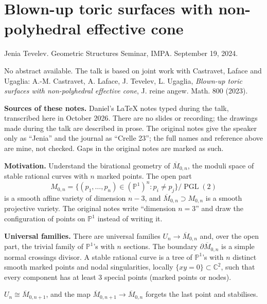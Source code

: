\section{Blown-up toric surfaces with
non-polyhedral effective cone}
\label{section-tevelev-blown-up-toric}

\noindent
Jenia Tevelev.
Geometric Structures Seminar, IMPA.
September 19, 2024.

\medskip\noindent
No abstract available. The talk is based on
joint work with Castravet, Laface and
Ugaglia: A.-M. Castravet, A. Laface,
J. Tevelev, L. Ugaglia, \emph{Blown-up toric
surfaces with non-polyhedral effective
cone}, J. reine angew. Math. 800 (2023).

\medskip\noindent
{\bf Sources of these notes.} Daniel's
LaTeX notes typed during the talk,
transcribed here in October 2026. There are
no slides or recording; the drawings made
during the talk are described in prose. The
original notes give the speaker only as
``Jenia'' and the journal as ``Crelle 23'';
the full names and reference above are mine,
not checked. Gaps in the original notes are
marked as such.

\medskip\noindent
{\bf Motivation.} Understand the birational
geometry of $\overline{M}_{0,n}$, the moduli
space of stable rational curves with $n$
marked points. The open part
$$
M_{0,n}=
\{(p_1,\ldots,p_n)\in(\mathbb{P}^1)^n :
p_i\neq p_j\}/\operatorname{PGL}(2)
$$
is a smooth affine variety of dimension
$n-3$, and $\overline{M}_{0,n}\supset
M_{0,n}$ is a smooth projective variety. The
original notes write ``dimension $n=3$'' and
draw the configuration of points on
$\mathbb{P}^1$ instead of writing it.

\medskip\noindent
{\bf Universal families.} There are
universal families
$U_n\to\overline{M}_{0,n}$ and, over the
open part, the trivial family of
$\mathbb{P}^1$'s with $n$ sections. The
boundary $\partial\overline{M}_{0,n}$ is a
simple normal crossings divisor. A stable
rational curve is a tree of $\mathbb{P}^1$'s
with $n$ distinct smooth marked points and
nodal singularities, locally
$\{xy=0\}\subset\mathbb{C}^2$, such that
every component has at least $3$ special
points (marked points or nodes).

\begin{lemma}
\label{lemma-tevelev-universal-family}
$U_n\cong\overline{M}_{0,n+1}$, and the map
$\overline{M}_{0,n+1}\to\overline{M}_{0,n}$
forgets the last point and stabilises.
\end{lemma}


